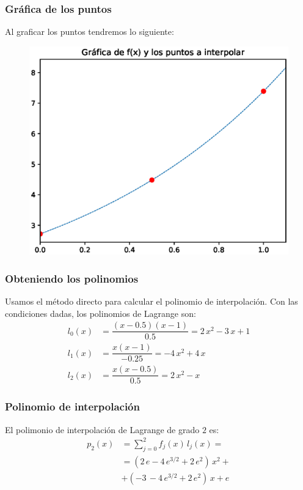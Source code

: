 \begin{frame}
\frametitle{Gráfica de los puntos}
Al graficar los puntos tendremos lo siguiente:
\begin{figure}
   \centering  
   \includegraphics[scale=0.52]{Imagenes/Ejemplo_interpolacion_Chebychev_01.eps}
\end{figure}
\end{frame}
\begin{frame}
\frametitle{Obteniendo los polinomios}
Usamos el método directo para calcular el polinomio de interpolación. Con las condiciones dadas, los polinomios de Lagrange son:
\begin{align*}
l_{0} (x) &= \dfrac{(x - 0.5)(x - 1)}{0.5} = 2 \, x^{2} - 3 \, x + 1 \\[0.5em]
l_{1} (x) &= \dfrac{x (x - 1)}{-0.25} = - 4 \, x^{2} + 4 \, x \\[0.5em]
l_{2} (x) &= \dfrac{x (x - 0.5)}{0.5} = 2 \, x^{2} - x
\end{align*}
\end{frame}
\begin{frame}
\frametitle{Polinomio de interpolación}
El polimonio de interpolación de Lagrange de grado $2$ es:
\begin{align*}
p_{2}(x) &= \sum_{j=0}^{2} f_{j}(x) \, l_{j}(x) = \\[0.5em]
&= (2 \, e - 4 \, e^{3/2} + 2 \, e^{2}) \, x^{2} + \\[0.5em]
&+ (-3 \, - 4 \, e^{3/2} + 2 \, e^{2}) \, x + e
\end{align*}
\end{frame}
